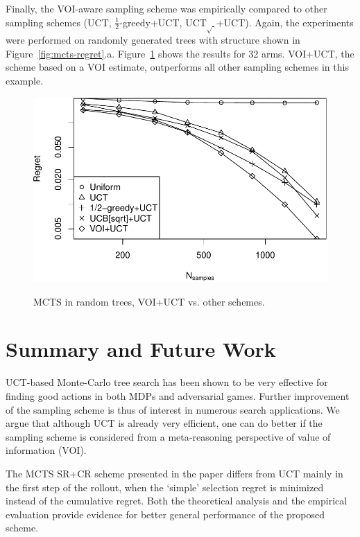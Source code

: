 \documentclass[letterpaper]{article}
\begin{document}
Finally, the VOI-aware sampling scheme was empirically compared to
other sampling schemes (UCT, $\frac 1 2$-greedy+UCT,
UCT$_{\sqrt{\cdot}}$+UCT). Again, the experiments were performed on
randomly generated trees with structure shown in
Figure~\ref{fig:mcts-regret}.a. Figure~\ref{fig:mcts-regret-voi} shows
the results for 32 arms. VOI+UCT, the scheme based on a VOI estimate,
outperforms all other sampling schemes in this example. 
\begin{figure}[h!]
  \centering
  \includegraphics[scale=0.45]{tree-identity-k=32-uqb=8+voi.pdf}\\
  \caption{MCTS in random trees, VOI+UCT vs. other schemes.}
  \label{fig:mcts-regret-voi}
\end{figure}

\section{Summary and Future Work}
\label{sec:summary}

UCT-based Monte-Carlo tree search has been shown to be very effective
for finding good actions in both MDPs and adversarial games.
Further improvement of the sampling scheme is thus of interest in
numerous search applications. We argue that although UCT is already very efficient,
one can do better if the sampling scheme is considered from a meta-reasoning
perspective of value of information (VOI).

The MCTS SR+CR scheme presented in the paper differs
from UCT mainly in the first step of the rollout, when the `simple' selection
regret is minimized instead of the cumulative regret. Both the
theoretical analysis and the empirical evaluation provide evidence for
better general performance of the proposed scheme.
\end{document}
